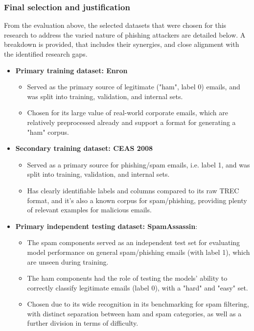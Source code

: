 
\subsubsection*{Final selection and justification}
From the evaluation above, the selected datasets that were chosen for this research to address the varied nature of phishing attackers are detailed below. A breakdown is provided, that includes their synergies, and close alignment with the identified research gaps.

\begin{itemize}
  \item \textbf{Primary training dataset: Enron}
  \begin{itemize}
    \item Served as the primary source of legitimate ("ham", label 0) emails, and was split into training, validation, and internal sets.
    \item Chosen for its large value of real-world corporate emails, which are relatively preprocessed already and support a format for generating a "ham" corpus.
  \end{itemize}
  \item \textbf{Secondary training dataset: CEAS 2008}
  \begin{itemize}
    \item Served as a primary source for phishing/spam emails, i.e. label 1, and was split into training, validation, and internal sets.
    \item Has clearly identifiable labels and columns compared to its raw TREC format, and it's also a known corpus for spam/phishing, providing plenty of relevant examples for malicious emails.
  \end{itemize}
  \item \textbf{Primary independent testing dataset: SpamAssassin}:
  \begin{itemize}
    \item The spam components served as an independent test set for evaluating model performance on general spam/phishing emails (with label 1), which are unseen during training.
    \item The ham components had the role of testing the models' ability to correctly classify legitimate emails (label 0), with a "hard" and "easy" set.
    \item Chosen due to its wide recognition in its benchmarking for spam filtering, with distinct separation between ham and spam categories, as well as a further division in terms of difficulty.

\end{itemize}
\end{itemize}
